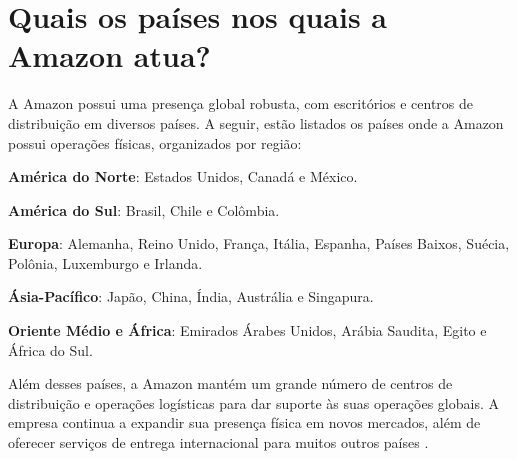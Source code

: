 \section{Quais os países nos quais a Amazon atua?}

A Amazon possui uma presença global robusta, com escritórios e centros de distribuição em diversos países. A seguir, estão listados os países onde a Amazon possui operações físicas, organizados por região:

\textbf{América do Norte}: Estados Unidos, Canadá e México.

\textbf{América do Sul}: Brasil, Chile e Colômbia.

\textbf{Europa}: Alemanha, Reino Unido, França, Itália, Espanha, Países Baixos, Suécia, Polônia, Luxemburgo e Irlanda.

\textbf{Ásia-Pacífico}: Japão, China, Índia, Austrália e Singapura.

\textbf{Oriente Médio e África}: Emirados Árabes Unidos, Arábia Saudita, Egito e África do Sul.

\vspace{0.4cm}
Além desses países, a Amazon mantém um grande número de centros de distribuição e operações logísticas para dar suporte às suas operações globais. A empresa continua a expandir sua presença física em novos mercados, além de oferecer serviços de entrega internacional para muitos outros países \cite{amazonGlobalOffices2023}.
